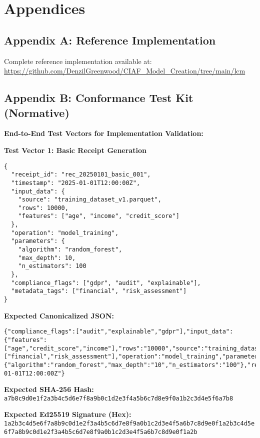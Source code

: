 \documentclass[12pt,a4paper]{article}
\begin{document}
\newpage

\section*{Appendices}

\subsection*{Appendix A: Reference Implementation}

Complete reference implementation available at: \\
\url{https://github.com/DenzilGreenwood/CIAF_Model_Creation/tree/main/lcm}

\subsection*{Appendix B: Conformance Test Kit (Normative)}

\textbf{End-to-End Test Vectors for Implementation Validation:}

\textbf{Test Vector 1: Basic Receipt Generation}
\begin{lstlisting}[caption=Input Receipt JSON]
{
  "receipt_id": "rec_20250101_basic_001",
  "timestamp": "2025-01-01T12:00:00Z",
  "input_data": {
    "source": "training_dataset_v1.parquet",
    "rows": 10000,
    "features": ["age", "income", "credit_score"]
  },
  "operation": "model_training",
  "parameters": {
    "algorithm": "random_forest",
    "max_depth": 10,
    "n_estimators": 100
  },
  "compliance_flags": ["gdpr", "audit", "explainable"],
  "metadata_tags": ["financial", "risk_assessment"]
}
\end{lstlisting}

\textbf{Expected Canonicalized JSON:}
\begin{lstlisting}[caption=Canonical Form]
{"compliance_flags":["audit","explainable","gdpr"],"input_data":{"features":["age","credit_score","income"],"rows":"10000","source":"training_dataset_v1.parquet"},"metadata_tags":["financial","risk_assessment"],"operation":"model_training","parameters":{"algorithm":"random_forest","max_depth":"10","n_estimators":"100"},"receipt_id":"rec_20250101_basic_001","timestamp":"2025-01-01T12:00:00Z"}
\end{lstlisting}

\textbf{Expected SHA-256 Hash:}
\texttt{a7b8c9d0e1f2a3b4c5d6e7f8a9b0c1d2e3f4a5b6c7d8e9f0a1b2c3d4e5f6a7b8}

\textbf{Expected Ed25519 Signature (Hex):}
\texttt{1a2b3c4d5e6f7a8b9c0d1e2f3a4b5c6d7e8f9a0b1c2d3e4f5a6b7c8d9e0f1a2b3c4d5e6f7a8b9c0d1e2f3a4b5c6d7e8f9a0b1c2d3e4f5a6b7c8d9e0f1a2b}
\end{document}
